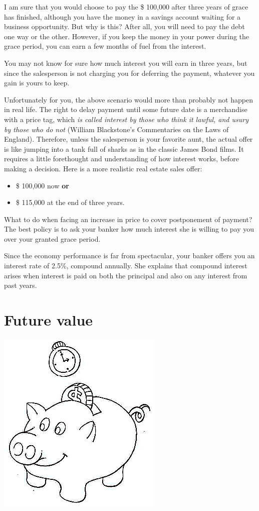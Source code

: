 \documentclass[a4paper,12pt]{book}
\begin{document}
I am sure that you would choose to pay the \$ 100,000 after
three years of grace has finished, although you have the
money in a savings account waiting for a business
opportunity. But why is this? After all, you will need
to pay the debt one way or the other. However, if you
keep the money in your power during the grace period,
you can earn a few months of fuel from the interest.

You may not know for sure how much interest you
will earn in three years, but since the salesperson
is not charging you for deferring the payment,
whatever you gain is yours to keep.

Unfortunately for you, the above scenario would
more than probably not happen in real life.
The right to delay payment until some future
date is a merchandise with a price tag,
which {\em is called interest by those who
think it lawful, and usury by those who
do not} (William Blackstone's Commentaries
on the Laws of England). Therefore, unless
the salesperson is your favorite aunt,
the actual offer is like jumping into a tank
full of sharks as in the classic James Bond films.
It requires a little forethought and understanding
of how interest works, before making a decision.
Here is a more realistic real estate sales offer:

\begin{itemize}
\item \$ 100,000 now {\bf or}
\item \$ 115,000 at the end of three years.
\end{itemize}

What to do when facing an increase in price
to cover postponement of payment? The best
policy is to ask your banker how much interest
she is willing to pay you over your
granted grace period.

Since the economy performance is far
from spectacular, your banker offers you
an interest rate of 2.5\%, compound annually.
She explains that compound interest arises
when interest is paid on both the principal
and also on any interest from past years.

\section{Future value}

\includegraphics{figs-prefix/piggy.jpg}
\end{document}
